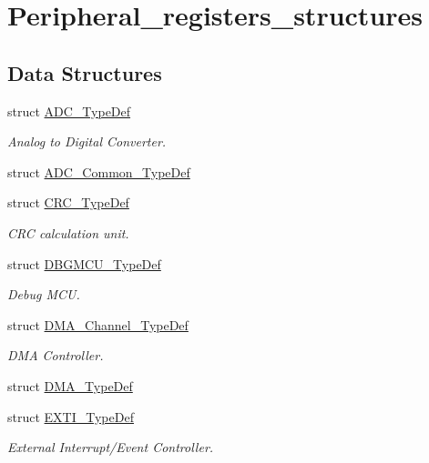 \hypertarget{group___peripheral__registers__structures}{}\section{Peripheral\+\_\+registers\+\_\+structures}
\label{group___peripheral__registers__structures}
\subsection*{Data Structures}
\begin{DoxyCompactItemize}
\item 
struct \hyperlink{struct_a_d_c___type_def}{A\+D\+C\+\_\+\+Type\+Def}
\begin{DoxyCompactList}\small\item\em Analog to Digital Converter. \end{DoxyCompactList}\item 
struct \hyperlink{struct_a_d_c___common___type_def}{A\+D\+C\+\_\+\+Common\+\_\+\+Type\+Def}
\item 
struct \hyperlink{struct_c_r_c___type_def}{C\+R\+C\+\_\+\+Type\+Def}
\begin{DoxyCompactList}\small\item\em C\+RC calculation unit. \end{DoxyCompactList}\item 
struct \hyperlink{struct_d_b_g_m_c_u___type_def}{D\+B\+G\+M\+C\+U\+\_\+\+Type\+Def}
\begin{DoxyCompactList}\small\item\em Debug M\+CU. \end{DoxyCompactList}\item 
struct \hyperlink{struct_d_m_a___channel___type_def}{D\+M\+A\+\_\+\+Channel\+\_\+\+Type\+Def}
\begin{DoxyCompactList}\small\item\em D\+MA Controller. \end{DoxyCompactList}\item 
struct \hyperlink{struct_d_m_a___type_def}{D\+M\+A\+\_\+\+Type\+Def}
\item 
struct \hyperlink{struct_e_x_t_i___type_def}{E\+X\+T\+I\+\_\+\+Type\+Def}
\begin{DoxyCompactList}\small\item\em External Interrupt/\+Event Controller. \end{DoxyCompactList}\item 

\end{DoxyCompactItemize}
